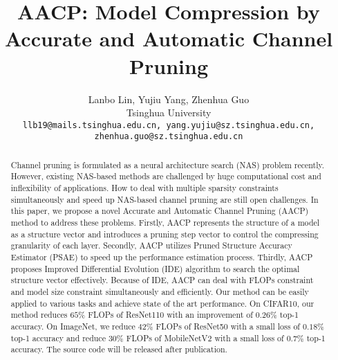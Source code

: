 \documentclass[final]{cvpr}
\begin{document}
\title{AACP: Model Compression by Accurate and Automatic Channel Pruning}

\author{Lanbo Lin, Yujiu Yang, Zhenhua Guo\\
Tsinghua University\\
{\tt\small llb19@mails.tsinghua.edu.cn, yang.yujiu@sz.tsinghua.edu.cn, zhenhua.guo@sz.tsinghua.edu.cn}
}


\maketitle


\begin{abstract}
   Channel pruning is formulated as a neural architecture search (NAS) problem recently. However, existing NAS-based methods are challenged by huge computational cost
   and inflexibility of applications. How to deal with multiple sparsity constraints simultaneously and speed up NAS-based 
   channel pruning are still open challenges. In this paper, we propose a novel Accurate and Automatic Channel Pruning 
   (AACP) method to address these problems. Firstly, AACP represents the structure of a model as a structure vector and introduces a
   pruning step vector to control the compressing granularity of each layer. Secondly, AACP utilizes Pruned Structure Accuracy Estimator (PSAE) to
   speed up the performance estimation process. Thirdly, AACP proposes Improved Differential Evolution (IDE) 
   algorithm to search the optimal structure vector effectively. Because of IDE, AACP can deal with FLOPs constraint and model size constraint simultaneously and efficiently.
   Our method can be easily applied to various tasks and achieve state of the art performance. On CIFAR10, our method reduces $65\%$ FLOPs 
   of ResNet110 with an improvement of $0.26\%$ top-1 accuracy. On ImageNet, we 
   reduce $42\%$ FLOPs of ResNet50 with a small loss of $0.18\%$ top-1 accuracy and reduce $30\%$ FLOPs of MobileNetV2 with a small loss of $0.7\%$ top-1 accuracy. 
   The source code will be released after publication.
\end{abstract}
\end{document}
